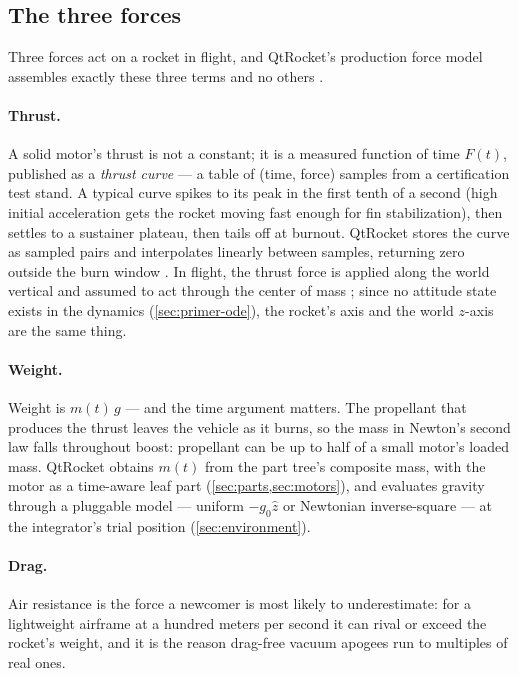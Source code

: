 \subsection{The three forces}\label{sec:primer-forces}

Three forces act on a rocket in flight, and QtRocket's production force model assembles
exactly these three terms and no others .

\paragraph{Thrust.} A solid motor's thrust is not a constant; it is a measured function of
time $F(t)$, published as a \emph{thrust curve} --- a table of (time, force) samples from a
certification test stand. A typical curve spikes to its peak in the first tenth of a second
(high initial acceleration gets the rocket moving fast enough for fin stabilization), then
settles to a sustainer plateau, then tails off at burnout. QtRocket stores the curve as
sampled pairs and interpolates linearly between samples, returning zero outside the burn
window . In flight, the thrust force is applied along the
world vertical and assumed to act through the center of mass
; since no attitude state exists in the dynamics
(\cref{sec:primer-ode}), the rocket's axis and the world $z$-axis are the same thing.

\paragraph{Weight.} Weight is $m(t)\,g$ --- and the time argument matters. The propellant
that produces the thrust leaves the vehicle as it burns, so the mass in Newton's second law
falls throughout boost: propellant can be up to half of a small motor's loaded mass. QtRocket obtains $m(t)$ from the part tree's composite mass, with the motor as a
time-aware leaf part
(\cref{sec:parts,sec:motors}), and evaluates gravity through a pluggable model --- uniform
$-g_0\hat{z}$ or Newtonian inverse-square --- at the integrator's trial position
 (\cref{sec:environment}).

\paragraph{Drag.} Air resistance is the force a newcomer is most likely to underestimate:
for a lightweight airframe at a hundred meters per second it can rival or exceed the
rocket's weight, and it is the reason drag-free vacuum apogees run to multiples of real
ones.


